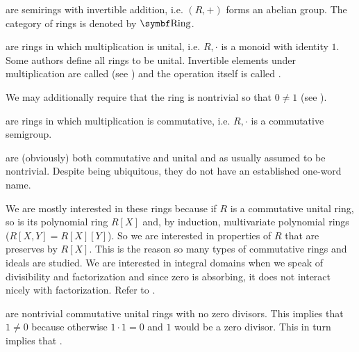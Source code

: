 \begin{definition}
\begin{defenum}
      are semirings with invertible addition, i.e. \( (R, +) \) forms an abelian group. The category of rings is denoted by \( \Cat{Ring} \).

      are rings in which multiplication is unital, i.e. \( R, \cdot \) is a monoid with identity \( 1 \). Some authors define all rings to be unital. Invertible elements under multiplication are called  (see ) and the operation itself is called .

    We may additionally require that the ring is nontrivial so that \( 0 \neq 1 \) (see ).

      are rings in which multiplication is commutative, i.e. \( R, \cdot \) is a commutative semigroup.

      are (obviously) both commutative and unital and as usually assumed to be nontrivial. Despite being ubiquitous, they do not have an established one-word name.

    We are mostly interested in these rings because if \( R \) is a commutative unital ring, so is its polynomial ring \( R[X] \) and, by induction\IND, multivariate polynomial rings (\( R[X, Y] = R[X][Y] \)). So we are interested in properties of \( R \) that are preserves by \( R[X] \). This is the reason so many types of commutative rings and ideals are studied. We are interested in integral domains when we speak of divisibility and factorization and since zero is absorbing, it does not interact nicely with factorization. Refer to .

      are nontrivial commutative unital rings with no zero divisors. This implies that \( 1 \neq 0 \) because otherwise \( 1 \cdot 1 = 0 \) and \( 1 \) would be a zero divisor. This in turn implies that .


\end{defenum}
\end{definition}
